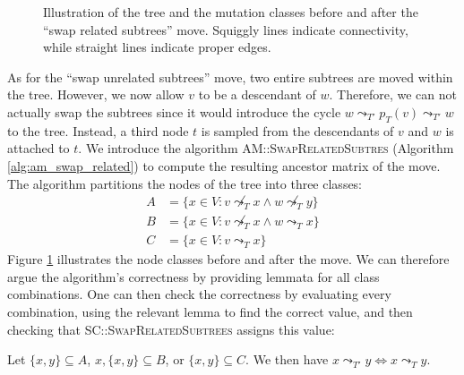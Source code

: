 \begin{figure}
    \caption{Illustration of the tree and the mutation classes before and after the ``swap related subtrees'' move. Squiggly lines indicate connectivity, while straight lines indicate proper edges.}
    \label{fig:related_swap_classes}
\end{figure}


As for the ``swap unrelated subtrees'' move, two entire subtrees are moved within the tree. However, we now allow $v$ to be a descendant of $w$. Therefore, we can not actually swap the subtrees since it would introduce the cycle $w \leadsto_{T'} p_T(v) \leadsto_{T'} w$ to the tree. Instead, a third node $t$ is sampled from the descendants of $v$ and $w$ is attached to $t$. We introduce the algorithm \textsc{AM::SwapRelatedSubtres} (Algorithm \ref{alg:am_swap_related}) to compute the resulting ancestor matrix of the move. The algorithm partitions the nodes of the tree into three classes:
\begin{align*}
    A &= \{x \in V: v \not\leadsto_T x \wedge w \not\leadsto_T y\} \\
    B &= \{x \in V: v \not\leadsto_T x \wedge w \leadsto_T x\} \\
    C &= \{x \in V: v \leadsto_T x\}
\end{align*}
Figure \ref{fig:related_swap_classes} illustrates the node classes before and after the move. We can therefore argue the algorithm's correctness by providing lemmata for all class combinations. One can then check the correctness by evaluating every combination, using the relevant lemma to find the correct value, and then checking that \textsc{SC::SwapRelatedSubtrees} assigns this value:

\begin{lemma}
    \label{lem:related_swap_equal}
    Let $\{x, y\} \subseteq A$, $x, \{x, y\} \subseteq B$, or $\{x, y\} \subseteq C$. We then have $x \leadsto_{T'} y \Leftrightarrow x \leadsto_T y$.
\end{lemma}

